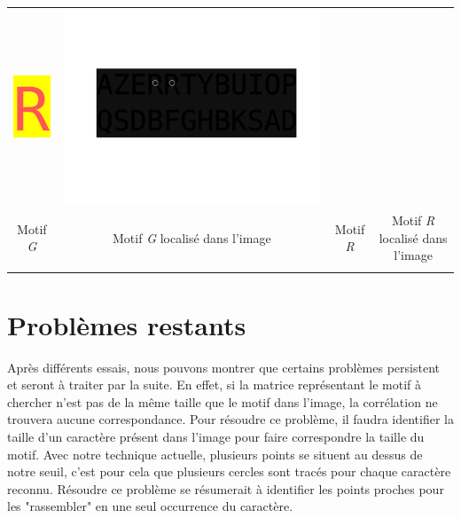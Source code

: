 \documentclass[a4paper,12pt,titlepage]{report}
\begin{document}
\begin{center}
\begin{tabular}{|cc|cc|}
			\includegraphics[scale=0.45]{../motif3.png} & \includegraphics[scale=0.15]{illus/motiflocal3.png}\\
			Motif \textit{G}  & Motif \textit{G} localisé dans l'image & 
			Motif \textit{R}  & Motif \textit{R} localisé dans l'image \\[0.1mm]
			& & & \\
			\hline
	\end{tabular}	
	\end{center}
	
	\section{Problèmes restants}
	Après différents essais, nous pouvons montrer que certains problèmes persistent et seront à traiter par la suite.
	En effet, si la matrice représentant le motif à chercher n'est pas de la même taille que le motif dans l'image, la corrélation ne trouvera aucune correspondance. Pour résoudre ce problème, il faudra identifier la taille d'un caractère présent dans l'image pour faire correspondre la taille du motif.
	Avec notre technique actuelle, plusieurs points se situent au dessus de notre seuil, c'est pour cela que plusieurs cercles sont tracés pour chaque caractère reconnu. Résoudre ce problème se résumerait à identifier les points proches pour les "rassembler" en une seul occurrence du caractère.
	
\end{document}
